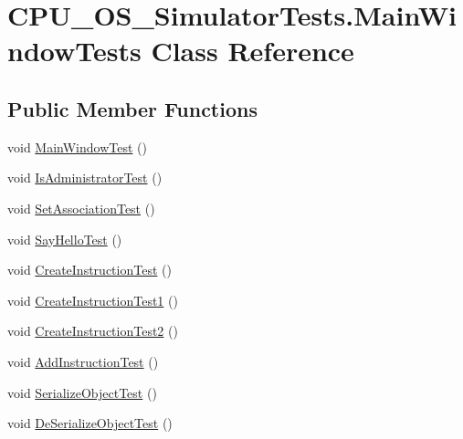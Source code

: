 \hypertarget{class_c_p_u___o_s___simulator_tests_1_1_main_window_tests}{}\section{C\+P\+U\+\_\+\+O\+S\+\_\+\+Simulator\+Tests.\+Main\+Window\+Tests Class Reference}
\label{class_c_p_u___o_s___simulator_tests_1_1_main_window_tests}
\subsection*{Public Member Functions}
\begin{DoxyCompactItemize}
\item 
void \hyperlink{class_c_p_u___o_s___simulator_tests_1_1_main_window_tests_ad4836ea701495048fdf8978a26b7289d}{Main\+Window\+Test} ()
\item 
void \hyperlink{class_c_p_u___o_s___simulator_tests_1_1_main_window_tests_aa579aa65b970afe2da85dfa00b099d22}{Is\+Administrator\+Test} ()
\item 
void \hyperlink{class_c_p_u___o_s___simulator_tests_1_1_main_window_tests_af75c3a60c45bb18647e31a2d992f7a9e}{Set\+Association\+Test} ()
\item 
void \hyperlink{class_c_p_u___o_s___simulator_tests_1_1_main_window_tests_a16c4c8bfd9dbe4351928f4a2f299cee6}{Say\+Hello\+Test} ()
\item 
void \hyperlink{class_c_p_u___o_s___simulator_tests_1_1_main_window_tests_a29622aedce4ad01ba057932fe4575769}{Create\+Instruction\+Test} ()
\item 
void \hyperlink{class_c_p_u___o_s___simulator_tests_1_1_main_window_tests_a721b270327db5b78e6706b5e6f086fee}{Create\+Instruction\+Test1} ()
\item 
void \hyperlink{class_c_p_u___o_s___simulator_tests_1_1_main_window_tests_abf58c3ed4fe1465c2d798dd77130c0d9}{Create\+Instruction\+Test2} ()
\item 
void \hyperlink{class_c_p_u___o_s___simulator_tests_1_1_main_window_tests_a0db1c879896356433f7ae1049f817748}{Add\+Instruction\+Test} ()
\item 
void \hyperlink{class_c_p_u___o_s___simulator_tests_1_1_main_window_tests_a819015644c93bfefb8e240777d42911a}{Serialize\+Object\+Test} ()
\item 
void \hyperlink{class_c_p_u___o_s___simulator_tests_1_1_main_window_tests_a540e4db419a8cb65c5e0156a4dc5f6d1}{De\+Serialize\+Object\+Test} ()
\end{DoxyCompactItemize}


